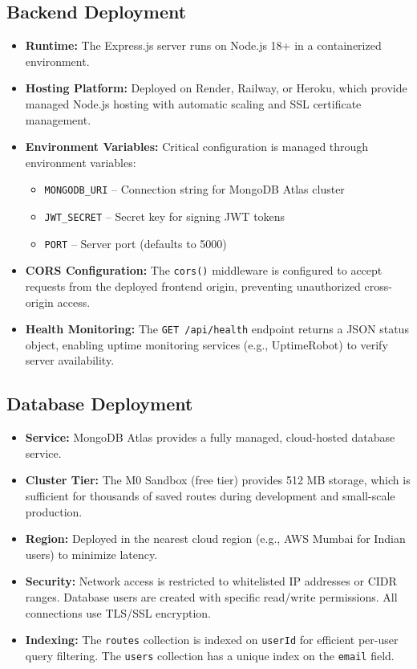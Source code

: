 \subsection{Backend Deployment}
\begin{itemize}
    \item \textbf{Runtime:} The Express.js server runs on Node.js 18+ in a containerized environment.
    \item \textbf{Hosting Platform:} Deployed on Render, Railway, or Heroku, which provide managed Node.js hosting with automatic scaling and SSL certificate management.
    \item \textbf{Environment Variables:} Critical configuration is managed through environment variables:
    \begin{itemize}
        \item \texttt{MONGODB\_URI} -- Connection string for MongoDB Atlas cluster
        \item \texttt{JWT\_SECRET} -- Secret key for signing JWT tokens
        \item \texttt{PORT} -- Server port (defaults to 5000)
    \end{itemize}
    \item \textbf{CORS Configuration:} The \texttt{cors()} middleware is configured to accept requests from the deployed frontend origin, preventing unauthorized cross-origin access.
    \item \textbf{Health Monitoring:} The \texttt{GET /api/health} endpoint returns a JSON status object, enabling uptime monitoring services (e.g., UptimeRobot) to verify server availability.
\end{itemize}

\subsection{Database Deployment}
\begin{itemize}
    \item \textbf{Service:} MongoDB Atlas provides a fully managed, cloud-hosted database service.
    \item \textbf{Cluster Tier:} The M0 Sandbox (free tier) provides 512 MB storage, which is sufficient for thousands of saved routes during development and small-scale production.
    \item \textbf{Region:} Deployed in the nearest cloud region (e.g., AWS Mumbai for Indian users) to minimize latency.
    \item \textbf{Security:} Network access is restricted to whitelisted IP addresses or CIDR ranges. Database users are created with specific read/write permissions. All connections use TLS/SSL encryption.
    \item \textbf{Indexing:} The \texttt{routes} collection is indexed on \texttt{userId} for efficient per-user query filtering. The \texttt{users} collection has a unique index on the \texttt{email} field.
\end{itemize}

